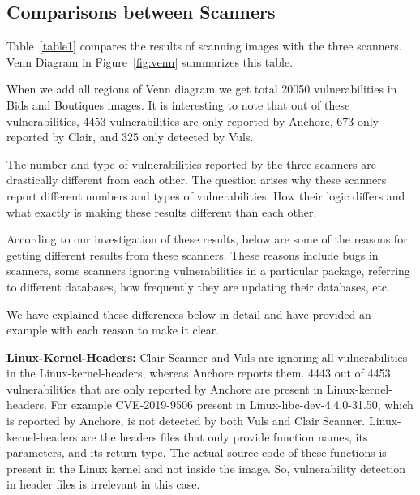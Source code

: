 \documentclass[a4paper,num-refs]{oup-contemporary}
\begin{document}
\subsection{Comparisons between Scanners}

Table~\ref{table1} compares the results of scanning images with the three scanners.
Venn Diagram in Figure~\ref{fig:venn} summarizes this table. 

When we add all regions of Venn diagram
we get total 20050 vulnerabilities in Bids and Boutiques images.
It is interesting to note that out of these vulnerabilities, 4453 vulnerabilities are only
reported by Anchore, 673 only reported by Clair, and 325 only detected by Vuls.

The number and type of vulnerabilities reported by the three scanners are drastically different from each other.
The question arises why these scanners report different numbers and types of vulnerabilities.
How their logic differs and what exactly is making these results different than each other.

According to our investigation of these results, below are some of the reasons for
getting different results from these scanners. These reasons include bugs in scanners,
some scanners ignoring vulnerabilities in a particular package, referring to different databases,
how frequently they are updating their databases, etc. 

We have explained these differences below in detail
and have provided an example with each reason to make it clear.

\textbf{Linux-Kernel-Headers:} Clair Scanner and Vuls are ignoring all vulnerabilities in the Linux-kernel-headers,
whereas Anchore reports them.
4443 out of 4453 vulnerabilities that are only reported by Anchore are present in Linux-kernel-headers.
For example CVE-2019-9506 present in Linux-libc-dev-4.4.0-31.50, which is reported by Anchore, is not
detected by both Vuls and Clair Scanner.
Linux-kernel-headers are the headers files that only provide function names, its parameters, and its
return type.
The actual source code of these functions is present in the Linux kernel and not inside the image.
So, vulnerability detection in header files
is irrelevant in this case.
\end{document}
